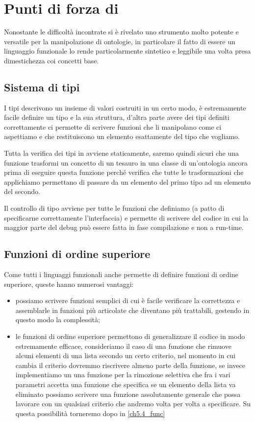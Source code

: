 \section{Punti di forza di \cduce}
Nonostante le difficoltà incontrate \cduce si è rivelato uno strumento molto potente e versatile per la manipolazione di ontologie, in particolare il fatto di essere un linguaggio funzionale lo rende particolarmente sintetico e leggibile una volta presa dimestichezza coi concetti base.
\subsection{Sistema di tipi}
I tipi descrivono un insieme di valori costruiti in un certo modo, è estremamente facile definire un tipo e la sua struttura, d'altra parte avere dei tipi definiti correttamente ci permette di scrivere funzioni che li manipolano come ci aspettiamo e che restituiscono un elemento esattamente del tipo che vogliamo.

Tutta la verifica dei tipi in \cduce avviene staticamente, saremo quindi sicuri che una funzione trasformi un concetto di un tesauro in una classe di un'ontologia ancora prima di eseguire questa funzione perché \cduce verifica che tutte le trasformazioni che applichiamo permettano di passare da un elemento del primo tipo ad un elemento del secondo.

Il controllo di tipo avviene per tutte le funzioni che definiamo (a patto di specificarne correttamente l'interfaccia) e permette di scrivere del codice in cui la maggior parte del debug può essere fatta in fase compilazione e non a run-time. 

\subsection{Funzioni di ordine superiore}
Come tutti i linguaggi funzionali anche \cduce permette di definire funzioni di ordine superiore, queste hanno numerosi vantaggi: 
\begin{itemize}
	\item possiamo scrivere funzioni semplici di cui è facile verificare la correttezza e assemblarle in funzioni più articolate che diventano più trattabili, gestendo in questo modo la complessità;
	\item le funzioni di ordine superiore permettono di generalizzare il codice in modo estremamente efficace, consideriamo il caso di una funzione che rimuove alcuni elementi di una lista secondo un certo criterio, nel momento in cui cambia il criterio dovremmo riscrivere almeno parte della funzione, se invece implementiamo un una funzione per la rimozione selettiva che fra i vari parametri accetta una funzione che specifica se un elemento della lista va eliminato possiamo scrivere una funzione assolutamente generale che possa lavorare con un qualsiasi criterio che andremo volta per volta a specificare. Su questa possibilità torneremo dopo in \ref{ch5.4_func}
\end{itemize}
